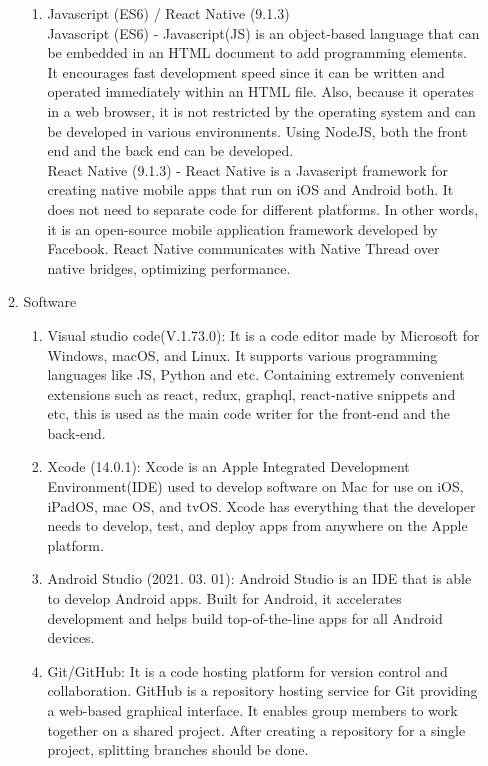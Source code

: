 \documentclass[conference]{IEEEtran}
\begin{document}
\begin{enumerate}[label=\arabic*.]
\begin{enumerate}[label=\alph*.]
\begin{enumerate}[label=\roman*.]
            \item {\large{Javascript (ES6) / React Native (9.1.3)}} \\
            Javascript (ES6) - Javascript(JS) is an object-based language that can be embedded in an HTML document to add programming elements. It encourages fast development speed since it can be written and operated immediately within an HTML file. Also, because it operates in a web browser, it is not restricted by the operating system and can be developed in various environments. Using NodeJS, both the front end and the back end can be developed. \\
            React Native (9.1.3) - React Native is a Javascript framework for creating native mobile apps that run on iOS and Android both. It does not need to separate code for different platforms. In other words, it is an open-source mobile application framework developed by Facebook. React Native communicates with Native Thread over native bridges, optimizing performance. \\
        \end{enumerate}
        \item {\large{Software}} \\
        \begin{enumerate}[label=\roman*.]
            \item {\large{Visual studio code(V.1.73.0): It is a code editor made by Microsoft for Windows, macOS, and Linux. It supports various programming languages like JS, Python and etc. Containing extremely convenient extensions such as react, redux, graphql, react-native snippets and etc, this is used as the main code writer for the front-end and the back-end.}} \\
            \item {\large{Xcode (14.0.1): Xcode is an Apple Integrated Development Environment(IDE) used to develop software on Mac for use on iOS, iPadOS, mac OS, and tvOS. Xcode has everything that the developer needs to develop, test, and deploy apps from anywhere on the Apple platform.}} \\
            \item {\large{Android Studio (2021. 03. 01): Android Studio is an IDE that is able to develop Android apps. Built for Android, it accelerates development and helps build top-of-the-line apps for all Android devices.}} \\
            \item {\large{Git/GitHub: It is a code hosting platform for version control and collaboration. GitHub is a repository hosting service for Git providing a web-based graphical interface. It enables group members to work together on a shared project. After creating a repository for a single project, splitting branches should be done.  }} \\ 

\end{enumerate}
\end{enumerate}
\end{enumerate}
\end{document}
